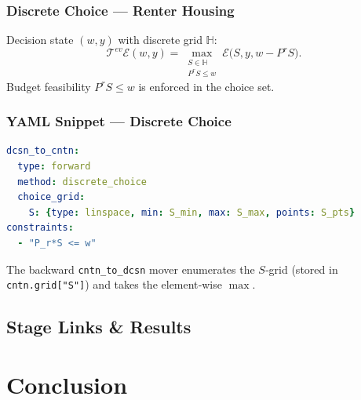 \documentclass[10pt]{beamer}
\begin{document}
\begin{frame}
  \frametitle{Discrete Choice — Renter Housing}
  Decision state $(w,y)$ with discrete grid $\mathbb H$:
  \[
    \mathscr T^{ev}\mathscr E(w,y)=
      \max_{\substack{S\in\mathbb H\\P^rS\le w}}
      \mathscr E\!\bigl(S,y,w-P^rS\bigr).
  \]
  Budget feasibility $P^r S\le w$ is enforced in the choice set.
\end{frame}

\begin{frame}[fragile]
  \frametitle{YAML Snippet — Discrete Choice}
\begin{lstlisting}[language=YAML]
dcsn_to_cntn:
  type: forward
  method: discrete_choice
  choice_grid:
    S: {type: linspace, min: S_min, max: S_max, points: S_pts}
constraints:
  - "P_r*S <= w"
\end{lstlisting}
  The backward \lstinline|cntn_to_dcsn| mover enumerates the $S$‑grid
  (stored in \lstinline|cntn.grid["S"]|) and takes the element‑wise $\max$.
\end{frame}



\subsection{Stage Links \& Results}


  




  









\section{Conclusion}
\end{document}
